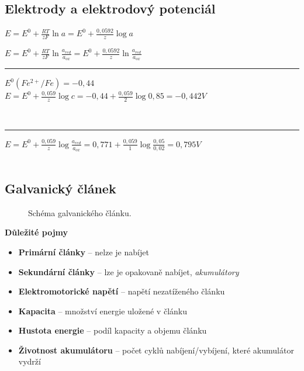 \subsection{Elektrody a elektrodový potenciál}

$E = E^0 + \frac{RT}{zF}\ln a = E^0 + \frac{0,0592}{z}\log a$

$E = E^0 + \frac{RT}{zF}\ln \frac{a_{red}}{a_{ox}} = E^0 + \frac{0,0592}{z}\ln \frac{a_{red}}{a_{ox}}$\\

\hrule


$E^0 (Fe^{2+}/Fe) = -0,44$\\

$E = E^0 + \frac{0,059}{z}\log c = -0,44 + \frac{0,059}{2}\log 0,85 = -0,442 V$

\\

\hrule


$E = E^0 + \frac{0,059}{z}\log \frac{a_{red}}{a_{ox}} = 0,771 + \frac{0,059}{1}\log \frac{0,05}{0,02} = 0,795 V$\\

\\

\clearpage

\subsection{Galvanický článek}

\begin{figure}[h]
	\caption[Schéma galvanického článku.]{Schéma galvanického článku.\footnotemark}
\end{figure}

\textbf{Důležité pojmy}
\begin{itemize}
	\item \textbf{Primární články} -- nelze je nabíjet
	\item \textbf{Sekundární články} -- lze je opakovaně nabíjet, \textit{akumulátory}
	\item \textbf{Elektromotorické napětí} -- napětí nezatíženého článku
	\item \textbf{Kapacita} -- množství energie uložené v článku
	\item \textbf{Hustota energie} -- podíl kapacity a objemu článku
	\item \textbf{Životnost akumulátoru} -- počet cyklů nabíjení/vybíjení, které akumulátor vydrží
\end{itemize}

